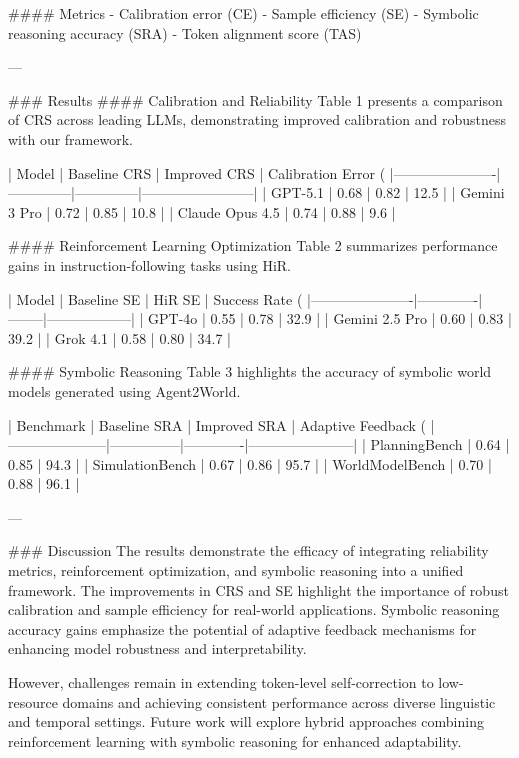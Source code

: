 #### Metrics
- Calibration error (CE)
- Sample efficiency (SE)
- Symbolic reasoning accuracy (SRA)
- Token alignment score (TAS)

---

### Results
#### Calibration and Reliability
Table 1 presents a comparison of CRS across leading LLMs, demonstrating improved calibration and robustness with our framework.

| Model                | Baseline CRS | Improved CRS | Calibration Error (%
|----------------------|--------------|--------------|------------------------|
| GPT-5.1             | 0.68         | 0.82         | 12.5                  |
| Gemini 3 Pro        | 0.72         | 0.85         | 10.8                  |
| Claude Opus 4.5     | 0.74         | 0.88         | 9.6                   |

#### Reinforcement Learning Optimization
Table 2 summarizes performance gains in instruction-following tasks using HiR.

| Model                | Baseline SE | HiR SE | Success Rate (%
|----------------------|-------------|--------|------------------|
| GPT-4o              | 0.55        | 0.78   | 32.9             |
| Gemini 2.5 Pro      | 0.60        | 0.83   | 39.2             |
| Grok 4.1            | 0.58        | 0.80   | 34.7             |

#### Symbolic Reasoning
Table 3 highlights the accuracy of symbolic world models generated using Agent2World.

| Benchmark           | Baseline SRA | Improved SRA | Adaptive Feedback (%
|---------------------|---------------|-------------|-----------------------|
| PlanningBench       | 0.64          | 0.85        | 94.3                  |
| SimulationBench     | 0.67          | 0.86        | 95.7                  |
| WorldModelBench     | 0.70          | 0.88        | 96.1                  |

---

### Discussion
The results demonstrate the efficacy of integrating reliability metrics, reinforcement optimization, and symbolic reasoning into a unified framework. The improvements in CRS and SE highlight the importance of robust calibration and sample efficiency for real-world applications. Symbolic reasoning accuracy gains emphasize the potential of adaptive feedback mechanisms for enhancing model robustness and interpretability.

However, challenges remain in extending token-level self-correction to low-resource domains and achieving consistent performance across diverse linguistic and temporal settings. Future work will explore hybrid approaches combining reinforcement learning with symbolic reasoning for enhanced adaptability.

